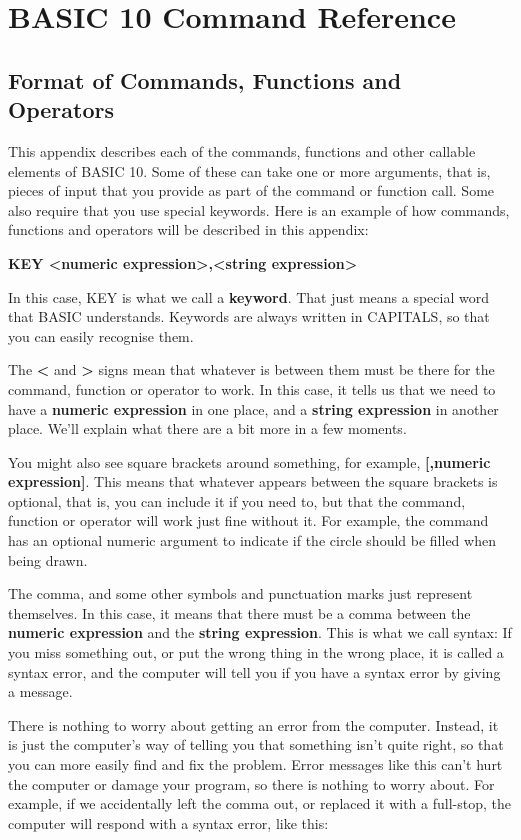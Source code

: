 \chapter{BASIC 10 Command Reference}

\section{Format of Commands, Functions and Operators}

This appendix describes each of the commands, functions and other callable elements of BASIC 10.
Some of these can take one or more arguments, that is, pieces of input that you provide as part of the command or function call.
Some also require that you use special keywords.
Here is an example of how commands, functions and operators will be described
in this appendix:

{\bf KEY <numeric expression>,<string expression> }

In this case, KEY is what we call a \textbf{keyword}. That just means a special word that BASIC
understands.  Keywords are always written in CAPITALS, so that you can easily recognise them.

The {\bf <} and {\bf >} signs mean that whatever is between them must be there for the command, function or operator to work.
In this case, it tells us that we need to have a {\bf numeric expression} in one place, and a {\bf string expression} in another place.
We'll explain what there are a bit more in a few moments.

You might also see square brackets around something, for example, {\bf [,numeric expression]}.
This means that whatever appears between the square brackets is optional, that is, you can include it if you need to, but
that the command, function or operator will work just fine without it.  For example, the  command has
an optional numeric argument to indicate if the circle should be filled when being drawn.

The comma, and some other symbols and punctuation marks just represent themselves.
In this case, it means that there must be a comma between the {\bf numeric expression} and the {\bf string expression}.
This is what we call syntax: If you miss something out, or put the wrong thing in the wrong place, it is called a
syntax error, and the computer will tell you if you have a syntax error by giving a  message.

There is nothing to worry about getting an error from the computer.
Instead, it is just the computer's way of telling you that something isn't quite right, so that you can more easily
find and fix the problem.
Error messages like this can't hurt the computer or damage your program, so there is nothing to worry about.
For example, if we accidentally left the comma out, or replaced it with a full-stop, the computer will respond with
a syntax error, like this:

